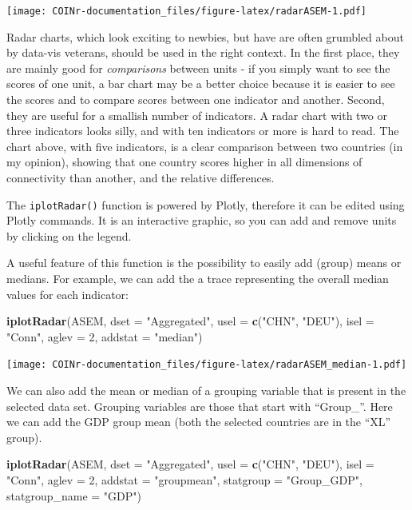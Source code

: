 \documentclass[
]{book}
\newenvironment{Shaded}{\begin{snugshade}}{\end{snugshade}}
\newcommand{\DataTypeTok}[1]{\textcolor[rgb]{0.13,0.29,0.53}{#1}}
\newcommand{\DecValTok}[1]{\textcolor[rgb]{0.00,0.00,0.81}{#1}}
\newcommand{\KeywordTok}[1]{\textcolor[rgb]{0.13,0.29,0.53}{\textbf{#1}}}
\newcommand{\NormalTok}[1]{#1}
\newcommand{\StringTok}[1]{\textcolor[rgb]{0.31,0.60,0.02}{#1}}
\begin{document}
\texttt{[image: COINr-documentation\_files/figure-latex/radarASEM-1.pdf]}

Radar charts, which look exciting to newbies, but have are often grumbled about by data-vis veterans, should be used in the right context. In the first place, they are mainly good for \emph{comparisons} between units - if you simply want to see the scores of one unit, a bar chart may be a better choice because it is easier to see the scores and to compare scores between one indicator and another. Second, they are useful for a smallish number of indicators. A radar chart with two or three indicators looks silly, and with ten indicators or more is hard to read. The chart above, with five indicators, is a clear comparison between two countries (in my opinion), showing that one country scores higher in all dimensions of connectivity than another, and the relative differences.

The \texttt{iplotRadar()} function is powered by Plotly, therefore it can be edited using Plotly commands. It is an interactive graphic, so you can add and remove units by clicking on the legend.

A useful feature of this function is the possibility to easily add (group) means or medians. For example, we can add the a trace representing the overall median values for each indicator:

\begin{Shaded}
\begin{Highlighting}[]
\KeywordTok{iplotRadar}\NormalTok{(ASEM, }\DataTypeTok{dset =} \StringTok{"Aggregated"}\NormalTok{, }\DataTypeTok{usel =} \KeywordTok{c}\NormalTok{(}\StringTok{"CHN"}\NormalTok{, }\StringTok{"DEU"}\NormalTok{), }\DataTypeTok{isel =} \StringTok{"Conn"}\NormalTok{, }\DataTypeTok{aglev =} \DecValTok{2}\NormalTok{, }\DataTypeTok{addstat =} \StringTok{"median"}\NormalTok{)}
\end{Highlighting}
\end{Shaded}

\texttt{[image: COINr-documentation\_files/figure-latex/radarASEM\_median-1.pdf]}

We can also add the mean or median of a grouping variable that is present in the selected data set. Grouping variables are those that start with ``Group\_''. Here we can add the GDP group mean (both the selected countries are in the ``XL'' group).

\begin{Shaded}
\begin{Highlighting}[]
\KeywordTok{iplotRadar}\NormalTok{(ASEM, }\DataTypeTok{dset =} \StringTok{"Aggregated"}\NormalTok{, }\DataTypeTok{usel =} \KeywordTok{c}\NormalTok{(}\StringTok{"CHN"}\NormalTok{, }\StringTok{"DEU"}\NormalTok{), }\DataTypeTok{isel =} \StringTok{"Conn"}\NormalTok{, }\DataTypeTok{aglev =} \DecValTok{2}\NormalTok{, }\DataTypeTok{addstat =} \StringTok{"groupmean"}\NormalTok{,}
           \DataTypeTok{statgroup =} \StringTok{"Group_GDP"}\NormalTok{, }\DataTypeTok{statgroup_name =} \StringTok{"GDP"}\NormalTok{)}
\end{Highlighting}
\end{Shaded}
\end{document}
